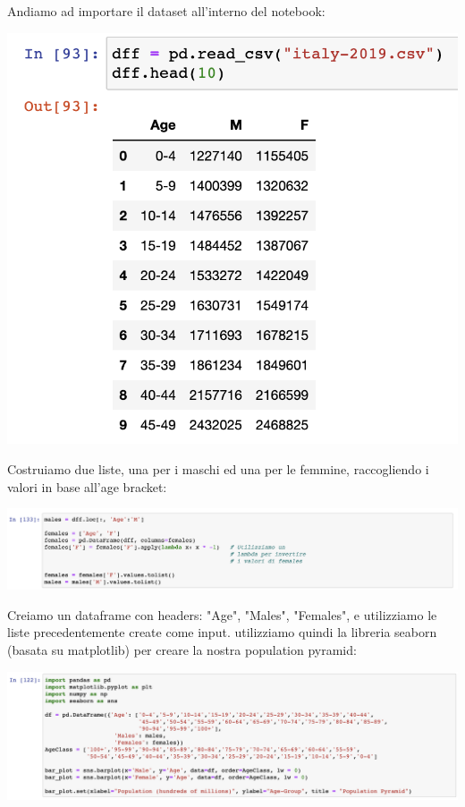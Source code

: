 \documentclass[11pt, oneside]{article}   	%
\begin{document}
Andiamo ad importare il dataset all'interno del notebook:
\begin{center}
\includegraphics[scale=0.6]{popitaly2}
\end{center}
Costruiamo due liste, una per i maschi ed una per le femmine, raccogliendo i valori in base all'age bracket:
\begin{center}
\includegraphics[scale=0.4]{popitaly3}
\end{center}
Creiamo un dataframe con headers: "Age", "Males", "Females", e utilizziamo le liste precedentemente create come input. utilizziamo quindi la libreria seaborn (basata su matplotlib) per creare la nostra population pyramid:
\begin{center}
\includegraphics[scale=0.4]{popitaly4}
\end{center}
\end{document}
